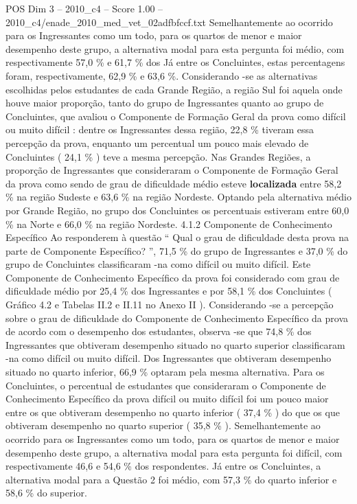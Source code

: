 \begin{textsample}{POS Dim 3 – 2010\_c4 – Score 1.00 – 2010\_c4/enade\_2010\_med\_vet\_02adfbfccf.txt}
Semelhantemente ao ocorrido para os Ingressantes como um todo, para os quartos de menor e maior desempenho deste grupo, a alternativa modal para esta pergunta foi médio, com respectivamente 57,0 \% e 61,7 \% dos Já entre os Concluintes, estas percentagens foram, respectivamente, 62,9 \% e 63,6 \%.
Considerando -se as alternativas escolhidas pelos estudantes de cada Grande Região, a região Sul foi aquela onde houve maior proporção, tanto do grupo de Ingressantes quanto ao grupo de Concluintes, que avaliou o Componente de Formação Geral da prova como difícil ou muito difícil : dentre os Ingressantes dessa região, 22,8 \% tiveram essa percepção da prova, enquanto um percentual um pouco mais elevado de Concluintes ( 24,1 \% ) teve a mesma percepção.
Nas Grandes Regiões, a proporção de Ingressantes que consideraram o Componente de Formação Geral da prova como sendo de grau de dificuldade médio esteve \textbf{localizada} entre 58,2 \% na região Sudeste e 63,6 \% na região Nordeste.
Optando pela alternativa médio por Grande Região, no grupo dos Concluintes os percentuais estiveram entre 60,0 \% na Norte e 66,0 \% na região Nordeste. 4.1.2 Componente de Conhecimento Específico Ao responderem à questão “ Qual o grau de dificuldade desta prova na parte de Componente Específico? ”, 71,5 \% do grupo de Ingressantes e 37,0 \% do grupo de Concluintes classificaram -na como difícil ou muito difícil.
Este Componente de Conhecimento Específico da prova foi considerado com grau de dificuldade médio por 25,4 \% dos Ingressantes e por 58,1 \% dos Concluintes ( Gráfico 4.2 e Tabelas II.2 e II.11 no Anexo II ).
Considerando -se a percepção sobre o grau de dificuldade do Componente de Conhecimento Específico da prova de acordo com o desempenho dos estudantes, observa -se que 74,8 \% dos Ingressantes que obtiveram desempenho situado no quarto superior classificaram -na como difícil ou muito difícil.
Dos Ingressantes que obtiveram desempenho situado no quarto inferior, 66,9 \% optaram pela mesma alternativa.
Para os Concluintes, o percentual de estudantes que consideraram o Componente de Conhecimento Específico da prova difícil ou muito difícil foi um pouco maior entre os que obtiveram desempenho no quarto inferior ( 37,4 \% ) do que os que obtiveram desempenho no quarto superior ( 35,8 \% ).
Semelhantemente ao ocorrido para os Ingressantes como um todo, para os quartos de menor e maior desempenho deste grupo, a alternativa modal para esta pergunta foi difícil, com respectivamente 46,6 e 54,6 \% dos respondentes.
Já entre os Concluintes, a alternativa modal para a Questão 2 foi médio, com 57,3 \% do quarto inferior e 58,6 \% do superior.

\end{textsample}
